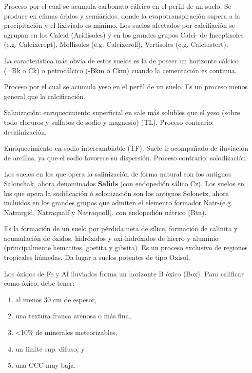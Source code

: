 Proceso por el cual se acumula carbonato cálcico en el perfil de un suelo.
Se produce en climas áridos y semiáridos, donde la evapotranspiración supera a la precipitación y el lixiviado es mínimo.
Los suelos afectados por calcifiación se agrupan en los Calcid (Aridisoles) y en los grandes grupos Calci- de Inceptisoles (e.g. Calcixerept), Mollisoles (e.g. Calcixeroll), Vertisoles (e.g. Calciustert).

La característica más obvia de estos suelos es la de poseer un horizonte cálcico (=Bk o Ck) o petrocálcico (-Bkm o Ckm) cuando la cementación es continua.


\begin{definition}[Gypsificación]
    Proceso por el cual se acumula yeso en el perfil de un suelo. Es un proceso menos general que la calcificación.
\end{definition}
\begin{definition}
    Salinización: enriquecimiento superficial en sale más solubles que el yeso (sobre todo cloruros y sulfatos de sodio y magnesio) (TL).
    Proceso contrario: desalinización.
\end{definition}
\begin{definition}[Sodificación (=solonización)]
    Enriquecimiento en sodio intercambiable (TF). Suele ir acompañado de iluviación de arcillas, ya que el sodio favorece su dispersión. Proceso contrario: solodización.
\end{definition}
Los suelos en los que opera la salinización de forma natural son los antiguos Salonchak, ahora denominados \textbf{Salids} (con endopedión sálico Cz).
Los suelos en los que opera la sodificación ó solonización son los antiguos Solonetz, ahora incluidos en los grandes grupos que admiten el elemento formador Natr-(e.g. Natrargid, Natraqualf y Natraquoll), con endopedión nátrico (Btn).
\begin{definition}[Ferralitización]
Es la formación de un suelo por pérdida neta de sílice, formación de calinita y acumulación de óxidos, hidróxidos y oxi-hidróxidos de hierro y aluminio (principalmente hematites, goetita y gibsita).
Es un proceso exclusivo de regiones tropicales húmedas.
Da lugar a suelos potentes de tipo Oxisol.
\end{definition}
Los óxidos de Fe y Al iluviados forma un horizonte B óxico (Box). Para calificar como óxico, debe tener:
\begin{enumerate}
    \item al menos 30 cm de espesor,
    \item una textura franca arenosa o más fina,
    \item <10\% de minerales meteorizables,
    \item un límite sup. difuso, y    
    \item una CCC muy baja.
\end{enumerate}
